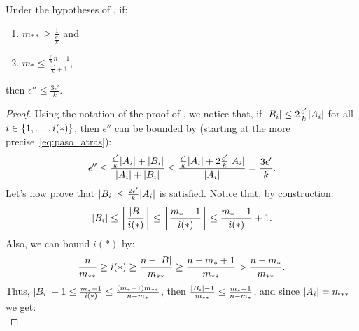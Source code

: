         \begin{remark} \label{rmk:epsilons_proportion_can_be_k}
            Under the hypotheses of , if:
            \begin{enumerate}[label={\Roman*}., ref={\Roman*}, font=\rmfamily]
                \item \label{itm:epsilons_proportion_can_be_k.a} $m_{**} \geq \frac{1}{\frac{\epsilon'}{k}}$ and
                \item \label{itm:epsilons_proportion_can_be_k.b} $m_* \leq \frac{\frac{\epsilon'}{k} n + 1}{\frac{\epsilon'}{k} + 1}$,
            \end{enumerate}
            then $\epsilon'' \leq \frac{3 \epsilon'}{k}$.
            \begin{proof}
                Using the notation of the proof of ,
                we notice that, if $| B_i | \leq 2 \frac{\epsilon'}{k} | A_i |$ for all $i \in \{ 1, \dots, i(*) \}$,
                then $\epsilon''$ can be bounded by (starting at the more precise~\eqref{eq:paso_atras}):
                \[
                    \epsilon'' \leq \frac{\frac{\epsilon'}{k} | A_i | + | B_i |}{| A_i | + | B_i |}
                    \leq \frac{\frac{\epsilon'}{k} | A_i | + 2 \frac{\epsilon'}{k} | A_i |}{| A_i |}
                    = \frac{3 \epsilon'}{k}.
                \]
                Let's now prove that $| B_i | \leq \frac{2 \epsilon'}{k} | A_i |$ is satisfied.
                Notice that, by construction:
                \[
                    | B_i | \leq \left\lceil \frac{| B |}{i(*)} \right\rceil \leq \left\lceil \frac{m_* - 1}{i(*)} \right\rceil \leq
                    \frac{m_* - 1}{i(*)} + 1.
                \]
                Also, we can bound $i(*)$ by:
                \[
                    \frac{n}{m_{**}} \geq i(*) \geq \frac{n - | B |}{m_{**}} \geq \frac{n - m_* + 1}{m_{**}} >
                    \frac{n - m_*}{m_{**}}.
                \]
                Thus, $| B_i | - 1 \leq \frac{m_* - 1}{i(*)} \leq \frac{( m_* - 1 ) m_{**}}{n - m_*}$,
                then $\frac{| B_i | - 1}{m_{**}} \leq \frac{m_* - 1}{n - m_*}$, and since $| A_i | = m_{**}$
                we get:
                \begin{equation} \label{eq:bound_of_Ai_Bi_fraction}

\end{equation}
\end{proof}
\end{remark}
